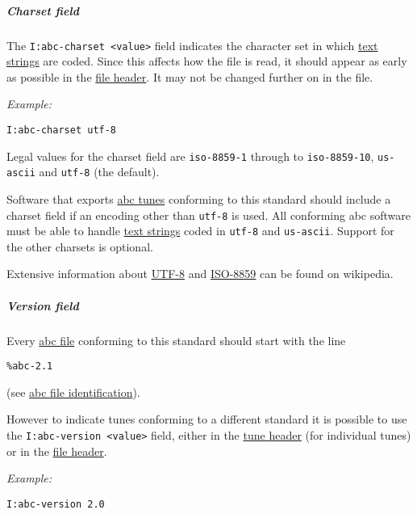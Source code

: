 \hypertarget{charset_field}{\subparagraph{Charset
field}\label{charset_field}}

The \texttt{I:abc-charset\ \textless{}value\textgreater{}} field
indicates the character set in which
\protect\hyperlink{text_string_definition}{text strings} are coded.
Since this affects how the file is read, it should appear as early as
possible in the \protect\hyperlink{file_header_definition}{file header}.
It may not be changed further on in the file.

\emph{Example:}

\begin{verbatim}
I:abc-charset utf-8
\end{verbatim}

Legal values for the charset field are \texttt{iso-8859-1} through to
\texttt{iso-8859-10}, \texttt{us-ascii} and \texttt{utf-8} (the
default).

Software that exports \protect\hyperlink{abc_tune_definition}{abc tunes}
conforming to this standard should include a charset field if an
encoding other than \texttt{utf-8} is used. All conforming abc software
must be able to handle \protect\hyperlink{text_string_definition}{text
strings} coded in \texttt{utf-8} and \texttt{us-ascii}. Support for the
other charsets is optional.

Extensive information about
\href{http://en.wikipedia.org/wiki/UTF-8}{UTF-8} and
\href{http://en.wikipedia.org/wiki/ISO/IEC_8859}{ISO-8859} can be found
on wikipedia.

\hypertarget{version_field}{\subparagraph{Version
field}\label{version_field}}

Every \protect\hyperlink{abc_file_definition}{abc file} conforming to
this standard should start with the line

\begin{verbatim}
%abc-2.1
\end{verbatim}

(see \protect\hyperlink{abc_file_identification}{abc file
identification}).

However to indicate tunes conforming to a different standard it is
possible to use the
\texttt{I:abc-version\ \textless{}value\textgreater{}} field, either in
the \protect\hyperlink{tune_header_definition}{tune header} (for
individual tunes) or in the
\protect\hyperlink{file_header_definition}{file header}.

\emph{Example:}

\begin{verbatim}
I:abc-version 2.0
\end{verbatim}

